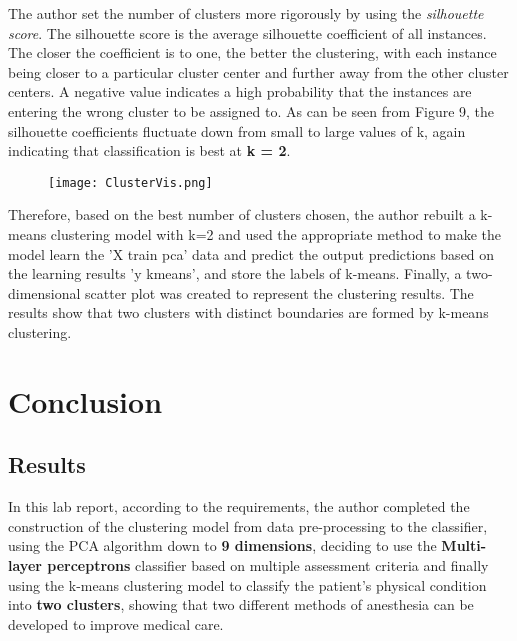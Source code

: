 \documentclass[10pt,twocolumn]{article}
\begin{document}
	The author set the number of clusters more rigorously by using the \textit{silhouette score}. The silhouette score is the average silhouette coefficient of all instances. The closer the coefficient is to one, the better the clustering, with each instance being closer to a particular cluster center and further away from the other cluster centers. A negative value indicates a high probability that the instances are entering the wrong cluster to be assigned to. As can be seen from Figure 9, the silhouette coefficients fluctuate down from small to large values of k, again indicating that classification is best at \textbf{k = 2}.
	
	\begin{figure}[h]
		\centering
		\texttt{[image: ClusterVis.png]}
		\caption{}
	\end{figure}
	
	Therefore, based on the best number of clusters chosen, the author rebuilt a k-means clustering model with k=2 and used the appropriate method to make the model learn the 'X train pca' data and predict the output predictions based on the learning results 'y kmeans', and store the labels of k-means. Finally, a two-dimensional scatter plot was created to represent the clustering results. The results show that two clusters with distinct boundaries are formed by k-means clustering.
	
	\section{Conclusion}
	\subsection{Results}
	In this lab report, according to the requirements, the author completed the construction of the clustering model from data pre-processing to the classifier, using the PCA algorithm down to \textbf{{9 dimensions}}, deciding to use the \textbf{Multi-layer perceptrons} classifier based on multiple assessment criteria and finally using the k-means clustering model to classify the patient's physical condition into \textbf{two clusters}, showing that two different methods of anesthesia can be developed to improve medical care.
	\\ \hspace*{\fill} \\
\end{document}
